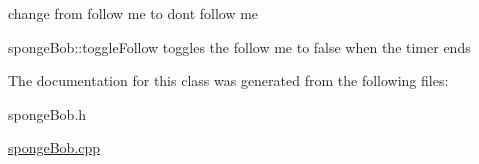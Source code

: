 change from follow me to dont follow me 

sponge\-Bob\-::toggle\-Follow toggles the follow me to false when the timer ends 

The documentation for this class was generated from the following files\-:\begin{DoxyCompactItemize}
\item 
sponge\-Bob.\-h\item 
\hyperlink{spongeBob_8cpp}{sponge\-Bob.\-cpp}\end{DoxyCompactItemize}
